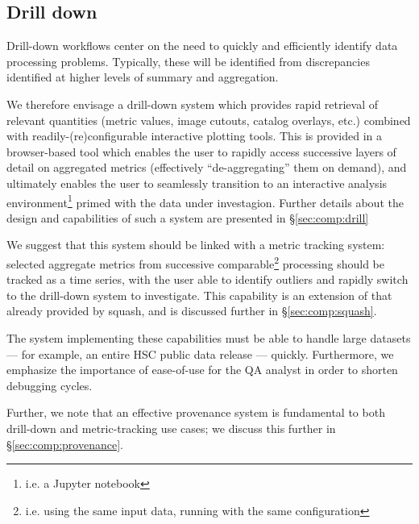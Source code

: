 \subsection{Drill down}
\label{sec:design:drill}

Drill-down workflows center on the need to quickly and efficiently identify
data processing problems. Typically, these will be identified from
discrepancies identified at higher levels of summary and aggregation.

We therefore envisage a drill-down system which provides rapid retrieval of
relevant quantities (metric values, image cutouts, catalog overlays, etc.)
combined with readily-(re)configurable interactive plotting tools. This is
provided in a browser-based tool which enables the user to rapidly access
successive layers of detail on aggregated metrics (effectively
``de-aggregating'' them on demand), and ultimately enables the user to
seamlessly transition to an interactive analysis environment\footnote{i.e. a
Jupyter notebook} primed with the data under investagion. Further details
about the design and capabilities of such a system are presented in
\S\ref{sec:comp:drill}

We suggest that this system should be linked with a metric tracking system:
selected \glspl{aggregate metric} from successive comparable\footnote{i.e.
using the same input data, running with the same configuration} processing
should be tracked as a time series, with the user able to identify outliers
and rapidly switch to the drill-down system to investigate. This capability is
an extension of that already provided by \gls{squash}, and is discussed
further in \S\ref{sec:comp:squash}.

The system implementing these capabilities must be able to handle large
datasets --- for example, an entire HSC public data release --- quickly.
Furthermore, we emphasize the importance of ease-of-use for the QA analyst in
order to shorten debugging cycles.

Further, we note that an effective \gls{provenance} system is fundamental to
both drill-down and metric-tracking use cases; we discuss this further in
\S\ref{sec:comp:provenance}.
